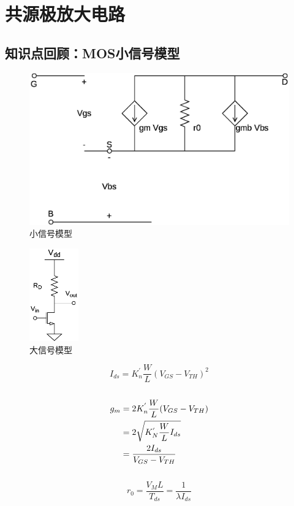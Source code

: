 \documentclass[twoside,a4paper,openright,titlepage,draft]{ctexrep}
\begin{document}
\tableofcontents
\newpage

\section{共源极放大电路}\label{sec:1}
\subsection{知识点回顾：MOS小信号模型}
\vspace*{1em}
\begin{multicols}{2}
    \begin{figure}[H]
        \centering
        \includegraphics[width=\columnwidth]{smallsignal.eps}
        \caption{小信号模型}
        \label{fig:小信号模型}
    \end{figure}
    \begin{figure}[H]
        \centering
        \includegraphics[height=40mm]{bigsignal.eps}
        \caption{大信号模型}
        \label{fig:大信号模型}
    \end{figure}
    \columnbreak
    \begin{equation}
        I_{ds} = K_{n}^{'}\frac{W}{L}(V_{GS} - V_{TH})^2
    \end{equation}
    \\
    \begin{align}
        g_{m} &= 2K_{n}^{'}\frac{W}{L}(V_{GS} - V_{TH}) \notag \\
        &= 2\sqrt{K_{N}^{'}\frac{W}{L}I_{ds}} \notag \\
        &= \frac{2I_{ds}}{V_{GS}-V_{TH}}
    \end{align}
    \\
    \begin{equation}
        r_0 = \frac{V_ML}{T_{ds}} =\frac{1}{\lambda I_{ds}}
    \end{equation} \\

\end{multicols}
\end{document}
